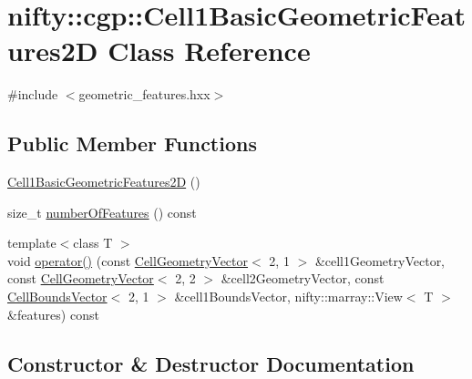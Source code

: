 \hypertarget{classnifty_1_1cgp_1_1Cell1BasicGeometricFeatures2D}{}\section{nifty\+:\+:cgp\+:\+:Cell1\+Basic\+Geometric\+Features2\+D Class Reference}
\label{classnifty_1_1cgp_1_1Cell1BasicGeometricFeatures2D}


{\ttfamily \#include $<$geometric\+\_\+features.\+hxx$>$}

\subsection*{Public Member Functions}
\begin{DoxyCompactItemize}
\item 
\hyperlink{classnifty_1_1cgp_1_1Cell1BasicGeometricFeatures2D_a21c1cd8100f7a511f5b500fd51527795}{Cell1\+Basic\+Geometric\+Features2\+D} ()
\item 
size\+\_\+t \hyperlink{classnifty_1_1cgp_1_1Cell1BasicGeometricFeatures2D_ad3d8a0e9bcdfdb30e86383b5d1a4fc26}{number\+Of\+Features} () const 
\item 
{\footnotesize template$<$class T $>$ }\\void \hyperlink{classnifty_1_1cgp_1_1Cell1BasicGeometricFeatures2D_a0f9075ca73167de4b8f592ed3ea467a0}{operator()} (const \hyperlink{classnifty_1_1cgp_1_1CellGeometryVector}{Cell\+Geometry\+Vector}$<$ 2, 1 $>$ \&cell1\+Geometry\+Vector, const \hyperlink{classnifty_1_1cgp_1_1CellGeometryVector}{Cell\+Geometry\+Vector}$<$ 2, 2 $>$ \&cell2\+Geometry\+Vector, const \hyperlink{classnifty_1_1cgp_1_1CellBoundsVector}{Cell\+Bounds\+Vector}$<$ 2, 1 $>$ \&cell1\+Bounds\+Vector, nifty\+::marray\+::\+View$<$ T $>$ \&features) const 
\end{DoxyCompactItemize}


\subsection{Constructor \& Destructor Documentation}
\hypertarget{classnifty_1_1cgp_1_1Cell1BasicGeometricFeatures2D_a21c1cd8100f7a511f5b500fd51527795}{}
